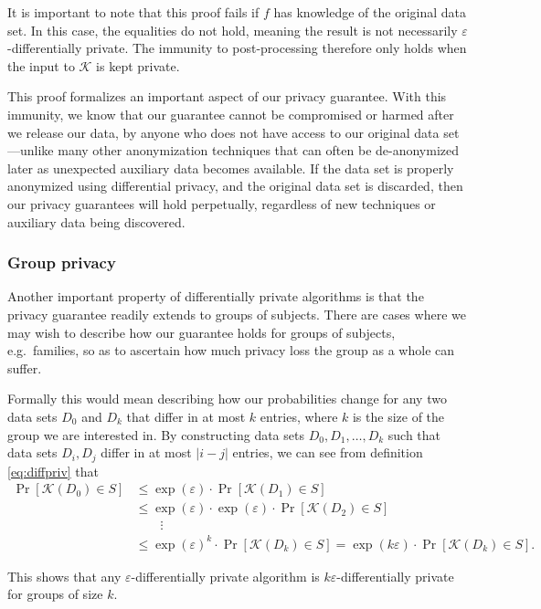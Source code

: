 \documentclass[a4paper,12pt]{article}
\newcommand{\fancy}{\mathcal}
\renewcommand{\epsilon}{\varepsilon}
\begin{document}
It is important to note that this proof fails if $f$ has knowledge of the original data set. In this case, the equalities do not hold, meaning the result is not necessarily $\epsilon$-differentially private. The immunity to post-processing therefore only holds when the input to $\fancy{K}$ is kept private.

This proof formalizes an important aspect of our privacy guarantee. With this immunity, we know that our guarantee cannot be compromised or harmed after we release our data, by anyone who does not have access to our original data set---unlike many other anonymization techniques that can often be de-anonymized later as unexpected auxiliary data becomes available. If the data set is properly anonymized using differential privacy, and the original data set is discarded, then our privacy guarantees will hold perpetually, regardless of new techniques or auxiliary data being discovered.

\subsubsection{Group privacy}

Another important property of differentially private algorithms is that the privacy guarantee readily extends to groups of subjects. There are cases where we may wish to describe how our guarantee holds for groups of subjects, e.g.\ families, so as to ascertain how much privacy loss the group as a whole can suffer.

Formally this would mean describing how our probabilities change for any two data sets $D_0$ and $D_k$ that differ in at most $k$ entries, where $k$ is the size of the group we are interested in. By constructing data sets $D_0, D_1, \dots, D_k$ such that data sets $D_i,D_j$ differ in at most $|i-j|$ entries, we can see from definition \ref{eq:diffpriv} that
\begin{align*}
    \Pr[\fancy{K}(D_0) \in S] &\leq \exp(\epsilon) \cdot \Pr[\fancy{K}(D_1) \in S] \\
        &\leq \exp(\epsilon) \cdot \exp(\epsilon) \cdot \Pr[\fancy{K}(D_2) \in S] \\
        &\qquad\vdots \\
        &\leq \exp(\epsilon)^k \cdot \Pr[\fancy{K}(D_k) \in S] = \exp(k\epsilon) \cdot \Pr[\fancy{K}(D_k) \in S].
\end{align*}

This shows that any $\epsilon$-differentially private algorithm is $k\epsilon$-differentially private for groups of size $k$. 
\end{document}
